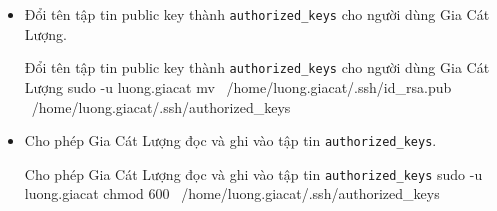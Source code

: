 \begin{itemize}[label={--}]
  \item Đổi tên tập tin public key thành \texttt{authorized\_keys} cho người dùng Gia Cát Lượng.\\
        \begin{coding}[gobble=10]{Đổi tên tập tin public key thành \texttt{authorized\_keys} cho người dùng Gia Cát Lượng}
          sudo -u luong.giacat mv \ /home/luong.giacat/.ssh/id_rsa.pub \ /home/luong.giacat/.ssh/authorized_keys
        \end{coding}

  \item Cho phép Gia Cát Lượng đọc và ghi vào tập tin \texttt{authorized\_keys}.\\
        \begin{coding}[gobble=10]{Cho phép Gia Cát Lượng đọc và ghi vào tập tin \texttt{authorized\_keys}}
          sudo -u luong.giacat chmod 600 \ /home/luong.giacat/.ssh/authorized_keys
        \end{coding}
\end{itemize}



